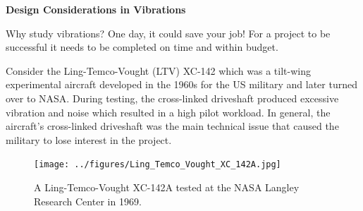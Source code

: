 \documentclass[12pt,letter]{article}
\begin{document}
		\begin{vibration_case_study}
			
			\textbf{Design Considerations in Vibrations}

			\noindent Why study vibrations? One day, it could save your job! For a project to be successful it needs to be completed on time and within budget. 
			
			Consider the Ling-Temco-Vought (LTV) XC-142  which was a tilt-wing experimental aircraft developed in the 1960s for the US military and later turned over to NASA. During testing, the cross-linked driveshaft produced excessive vibration and noise which resulted in a high pilot workload. In general, the aircraft's cross-linked driveshaft was the main technical issue that caused the military to lose interest in the project. 
			
			\begin{figure}[H]
				\centering
				\texttt{[image: ../figures/Ling\_Temco\_Vought\_XC\_142A.jpg]}
				\caption{A Ling-Temco-Vought XC-142A tested at the NASA Langley Research Center in 1969. \protect\footnotemark[1]}
			\end{figure}
		\end{vibration_case_study}
\end{document}
